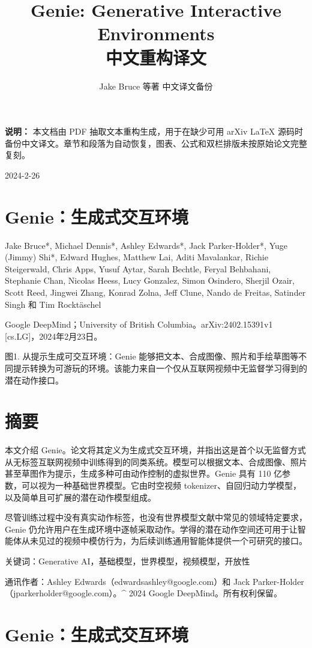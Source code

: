 \documentclass[10pt]{article}
\title{Genie: Generative Interactive Environments\\[0.5em]\large 中文重构译文}
\author{Jake Bruce 等著 \quad 中文译文备份}
\date{}
\begin{document}
\maketitle

\noindent\textbf{说明：} 本文档由 PDF 抽取文本重构生成，用于在缺少可用 arXiv LaTeX 源码时备份中文译文。章节和段落为自动恢复，图表、公式和双栏排版未按原始论文完整复刻。

\bigskip

2024-2-26

\section*{Genie：生成式交互环境}
Jake Bruce*, Michael Dennis*, Ashley Edwards*, Jack Parker-Holder*, Yuge (Jimmy) Shi*, Edward Hughes, Matthew Lai, Aditi Mavalankar, Richie Steigerwald, Chris Apps, Yusuf Aytar, Sarah Bechtle, Feryal Behbahani, Stephanie Chan, Nicolas Heess, Lucy Gonzalez, Simon Osindero, Sherjil Ozair, Scott Reed, Jingwei Zhang, Konrad Zolna, Jeff Clune, Nando de Freitas, Satinder Singh 和 Tim Rocktäschel

Google DeepMind；University of British Columbia。arXiv:2402.15391v1 [cs.LG]，2024年2月23日。

图1. 从提示生成可交互环境：Genie 能够把文本、合成图像、照片和手绘草图等不同提示转换为可游玩的环境。该能力来自一个仅从互联网视频中无监督学习得到的潜在动作接口。

\section*{摘要}
本文介绍 Genie。论文将其定义为生成式交互环境，并指出这是首个以无监督方式从无标签互联网视频中训练得到的同类系统。模型可以根据文本、合成图像、照片甚至草图作为提示，生成多种可由动作控制的虚拟世界。Genie 具有 110 亿参数，可以视为一种基础世界模型。它由时空视频 tokenizer、自回归动力学模型，以及简单且可扩展的潜在动作模型组成。

尽管训练过程中没有真实动作标签，也没有世界模型文献中常见的领域特定要求，Genie 仍允许用户在生成环境中逐帧采取动作。学得的潜在动作空间还可用于让智能体从未见过的视频中模仿行为，为后续训练通用智能体提供一个可研究的接口。

关键词：Generative AI，基础模型，世界模型，视频模型，开放性

通讯作者：Ashley Edwards（edwardsashley@google.com）和 Jack Parker-Holder（jparkerholder@google.com）。\textasciicircum{} 2024 Google DeepMind。所有权利保留。

\section*{Genie：生成式交互环境}
\end{document}
